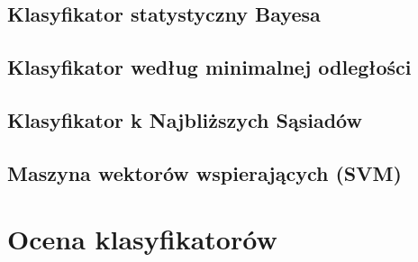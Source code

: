 	\subsection{Klasyfikator statystyczny Bayesa}
	
	\subsection{Klasyfikator według minimalnej odległości}
	
	\subsection{Klasyfikator k Najbliższych Sąsiadów}

	\subsection{Maszyna wektorów wspierających (SVM)}
	
\section{Ocena klasyfikatorów}


